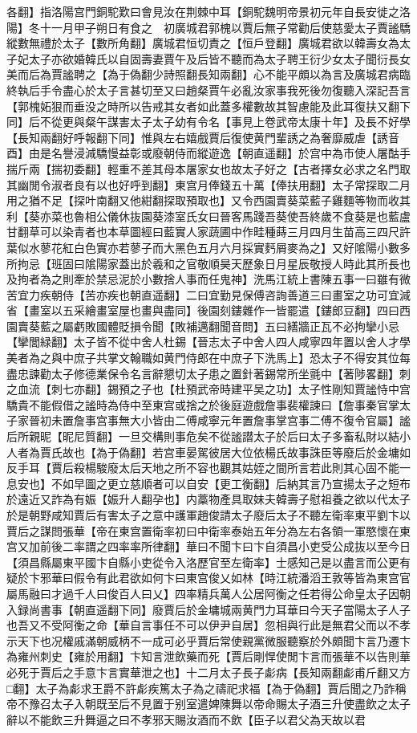 各翻】指洛陽宫門銅駝歎曰會見汝在荆棘中耳【銅駝魏明帝景初元年自長安徙之洛陽】冬十一月甲子朔日有食之　初廣城君郭槐以賈后無子常勸后使慈愛太子賈謐驕縱數無禮於太子【數所角翻】廣城君恒切責之【恒戶登翻】廣城君欲以韓壽女為太子妃太子亦欲婚韓氏以自固壽妻賈午及后皆不聽而為太子聘王衍少女太子聞衍長女美而后為賈謐聘之【為于偽翻少詩照翻長知兩翻】心不能平頗以為言及廣城君病臨終執后手令盡心於太子言甚切至又曰趙粲賈午必亂汝家事我死後勿復聽入深記吾言【郭槐妬狠而垂没之時所以告戒其女者如此蓋多權數故其智慮能及此耳復扶又翻下同】后不從更與粲午謀害太子太子幼有令名【事見上卷武帝太康十年】及長不好學【長知兩翻好呼報翻下同】惟與左右嬉戲賈后復使黄門輩誘之為奢靡威虐【誘音酉】由是名譽浸減驕慢益彰或廢朝侍而縱遊逸【朝直遥翻】於宫中為市使人屠酤手揣斤兩【揣初委翻】輕重不差其母本屠家女也故太子好之【古者擇女必求之名門取其幽閒令淑者良有以也好呼到翻】東宫月俸錢五十萬【俸扶用翻】太子常探取二月用之猶不足【探叶南翻又他紺翻探取預取也】又令西園賣葵菜藍子雞麵等物而收其利【葵亦菜也魯相公儀休抜園葵漆室氏女曰晉客馬踐吾葵使吾終歲不食葵是也藍盧甘翻草可以染青者也本草圖經曰藍實人家蔬圃中作畦種蒔三月四月生苗高三四尺許葉似水蓼花紅白色實亦若蓼子而大黑色五月六月採實麫屑麥為之】又好隂陽小數多所拘忌【班固曰隂陽家蓋出於羲和之官敬順昊天歷象日月星辰敬授人時此其所長也及拘者為之則牽於禁忌泥於小數捨人事而任鬼神】洗馬江統上書陳五事一曰雖有微苦宜力疾朝侍【苦亦疾也朝直遥翻】二曰宜勤見保傅咨詢善道三曰畫室之功可宜減省【畫室以五采繪畫室屋也畫與盡同】後園刻鏤雜作一皆罷遣【鏤郎豆翻】四曰西園賣葵藍之屬虧敗國體貶損令聞【敗補邁翻聞音問】五曰繕牆正瓦不必拘攣小忌【攣閭緑翻】太子皆不從中舍人杜錫【晉志太子中舍人四人咸寧四年置以舍人才學美者為之與中庶子共掌文翰職如黄門侍郎在中庶子下洗馬上】恐太子不得安其位每盡忠諫勸太子修德業保令名言辭懇切太子患之置針著錫常所坐氈中【著陟畧翻】刺之血流【刺七亦翻】錫預之子也【杜預武帝時建平吴之功】太子性剛知賈謐恃中宫驕貴不能假借之謐時為侍中至東宫或捨之於後庭遊戲詹事裴權諫曰【詹事秦官掌太子家晉初未置詹事宫事無大小皆由二傅咸寧元年置詹事掌宫事二傅不復令官屬】謐后所親昵【昵尼質翻】一旦交構則事危矣不從謐譛太子於后曰太子多畜私財以結小人者為賈氏故也【為于偽翻】若宫車晏駕彼居大位依楊氏故事誅臣等廢后於金墉如反手耳【賈后殺楊駿廢太后天地之所不容也觀其姑姪之間所言若此則其心固不能一息安也】不如早圖之更立慈順者可以自安【更工衡翻】后納其言乃宣揚太子之短布於遠近又詐為有娠【娠升人翻孕也】内藁物產具取妹夫韓壽子慰祖養之欲以代太子於是朝野咸知賈后有害太子之意中護軍趙俊請太子廢后太子不聽左衛率東平劉卞以賈后之謀問張華【帝在東宫置衛率初曰中衛率泰始五年分為左右各領一軍愍懷在東宫又加前後二率謂之四率率所律翻】華曰不聞卞曰卞自須昌小吏受公成抜以至今日【須昌縣屬東平國卞自縣小吏從令入洛歷官至左衛率】士感知己是以盡言而公更有疑於卞邪華曰假令有此君欲如何卞曰東宫俊乂如林【時江統潘滔王敦等皆為東宫官屬馬融曰才過千人曰俊百人曰乂】四率精兵萬人公居阿衡之任若得公命皇太子因朝入録尚書事【朝直遥翻下同】廢賈后於金墉城兩黄門力耳華曰今天子當陽太子人子也吾又不受阿衡之命【華自言事任不可以伊尹自居】忽相與行此是無君父而以不孝示天下也况權戚滿朝威柄不一成可必乎賈后常使親黨微服聽察於外頗聞卞言乃遷卞為雍州刺史【雍於用翻】卞知言泄飲藥而死【賈后剛悍使閒卞言而張華不以告則華必死于賈后之手意卞言實華泄之也】十二月太子長子虨病【長知兩翻虨甫斤翻又方□翻】太子為虨求王爵不許虨疾篤太子為之禱祀求福【為于偽翻】賈后聞之乃詐稱帝不豫召太子入朝既至后不見置于别室遣婢陳舞以帝命賜太子酒三升使盡飲之太子辭以不能飲三升舞逼之曰不孝邪天賜汝酒而不飲【臣子以君父為天故以君